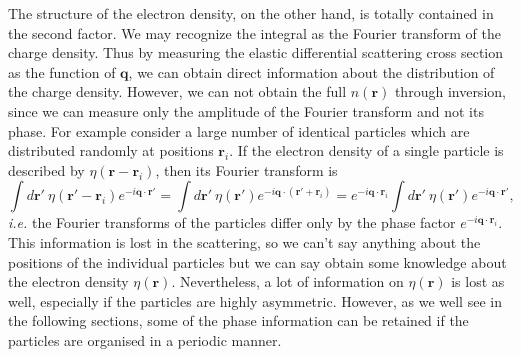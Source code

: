 The structure of the electron density, on the other hand, is totally contained in the second factor. We may recognize the integral as the Fourier transform of the charge density. Thus by measuring the elastic differential scattering cross section as the function of $\mathbf{q}$, we can obtain direct information about the distribution of the charge density. However, we can not obtain the full $n(\mathbf{r})$ through inversion, since we can measure only the amplitude of the Fourier transform and not its phase. For example consider a large number of identical particles which are distributed randomly at positions $\mathbf{r}_i$. If the electron density of a single particle is described by $\eta(\mathbf{r}-\mathbf{r}_i)$, then its Fourier transform is
\begin{equation}
\int d\mathbf{r}' \  \eta(\mathbf{r}'-\mathbf{r}_i)  e^{-i \mathbf{q}\cdot\mathbf{r}'} = \int d\mathbf{r}' \ \eta(\mathbf{r}')  e^{-i \mathbf{q}\cdot(\mathbf{r}'+\mathbf{r}_i)} = 
e^{-i \mathbf{q}\cdot\mathbf{r}_i}
\int d\mathbf{r}' \  \eta(\mathbf{r}')  e^{-i \mathbf{q}\cdot\mathbf{r}'},
\end{equation}
\emph{i.e.} the Fourier transforms of the particles differ only by the phase factor $e^{-i \mathbf{q}\cdot\mathbf{r}_i}$. This information is lost in the scattering, so we can't say anything about the positions of the individual particles but we can say obtain some knowledge about the electron density $\eta(\mathbf{r})$. Nevertheless, a lot of information on $\eta(\mathbf{r})$ is lost as well, especially if the particles are highly asymmetric. However, as we well see in the following sections, some of the phase information can be retained if the particles are organised in a periodic manner.